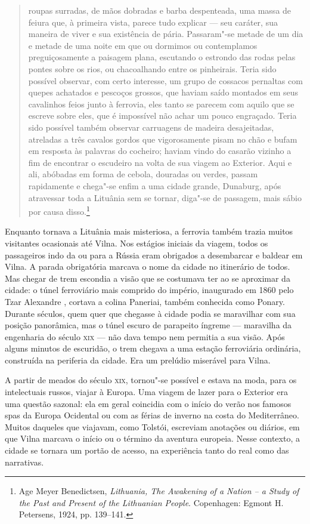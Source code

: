 \begin{quote}
roupas surradas, de mãos dobradas e barba despenteada, uma massa de
feiura que, à primeira vista, parece tudo explicar --- seu caráter, sua
maneira de viver e sua existência de pária. Passaram"-se metade de um dia
e metade de uma noite em que ou dormimos ou contemplamos preguiçosamente
a paisagem plana, escutando o estrondo das rodas pelas pontes sobre os
rios, ou chacoalhando entre os pinheirais. Teria sido possível observar,
com certo interesse, um grupo de cossacos pernaltas com quepes achatados
e pescoços grossos, que haviam saído montados em seus cavalinhos feios
junto à ferrovia, eles tanto se parecem com aquilo que se escreve sobre
eles, que é impossível não achar um pouco engraçado. Teria sido possível
também observar carruagens de madeira desajeitadas, atreladas a três
cavalos gordos que vigorosamente pisam no chão e bufam em resposta às
palavras do cocheiro; haviam vindo do casarão vizinho a fim de encontrar
o escudeiro na volta de sua viagem ao Exterior. Aqui e ali, abóbadas em
forma de cebola, douradas ou verdes, passam rapidamente e chega"-se enfim
a uma cidade grande, Dunaburg, após atravessar toda a Lituânia sem se
tornar, diga"-se de passagem, mais sábio por causa disso.\footnote{Age Meyer Benedictsen, \textit{Lithuania, The Awakening of a Nation -- a Study of the Past and Present of the Lithuanian People}. Copenhagen: Egmont H. Petersens, 1924, pp. 139--141.} 
\end{quote}

Enquanto tornava a Lituânia mais misteriosa, a ferrovia também trazia
muitos visitantes ocasionais até Vilna. Nos estágios iniciais da viagem,
todos os passageiros indo da ou para a Rússia eram obrigados a
desembarcar e baldear em Vilna. A parada obrigatória marcava o nome da
cidade no itinerário de todos. Mas chegar de trem escondia a visão que
se costumava ter ao se aproximar da cidade: o túnel ferroviário mais
comprido do império, inaugurado em 1860 pelo Tzar Alexandre , cortava
a colina Paneriai, também conhecida como Ponary. Durante séculos, quem quer que chegasse à
cidade podia se maravilhar com sua posição panorâmica, mas o túnel
escuro de parapeito íngreme --- maravilha da engenharia do século \textsc{xix} --- não
dava tempo nem permitia a sua visão. Após alguns minutos de escuridão, o
trem chegava a uma estação ferroviária ordinária, construída na
periferia da cidade. Era um prelúdio miserável para Vilna.

A partir de meados do século \textsc{xix}, tornou"-se possível e estava na moda,
para os intelectuais russos, viajar à Europa. Uma viagem de lazer para o
Exterior era uma questão sazonal: ela em geral coincidia com o início do
verão nos famosos spas da Europa Ocidental ou com as férias de inverno
na costa do Mediterrâneo. Muitos daqueles que viajavam, como Tolstói,
escreviam anotações ou diários, em que Vilna marcava o início ou o
término da aventura europeia. Nesse contexto, a cidade se tornara um
portão de acesso, na experiência tanto do real como das narrativas.

